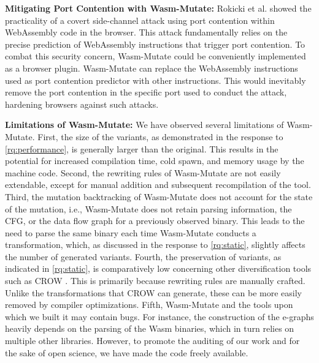 \documentclass[a4paper,fleqn]{cas-dc}
\newcommand*\badge[1]{ \colorbox{red}{\color{white}#1}}
\newcommand{\tool}{{\sc Wasm-Mutate}\xspace}
\newcommand{\Wasm}{WebAssembly\xspace}
\newcommand{\wasm}{\Wasm}
\newenvironment{revision1}{\color{blue}}{}
\newcommand{\todo}[1]{%
\refstepcounter{todo}
\noindent\textbf{\badge{TODO}} {\color{red}#1}
\addcontentsline{td}{todo}
{\color{red}\thesection.\thetodo\xspace #1}}
\begin{document}
\textbf{Mitigating Port Contention with \tool:} 
Rokicki et al. \cite{10.1145/3488932.3517411} showed the practicality of a covert side-channel attack using port contention within \Wasm code in the browser. This attack fundamentally relies on the precise prediction of WebAssembly instructions that trigger port contention.
To combat this security concern, \tool could be conveniently implemented as a browser plugin. 
\tool can replace the \wasm instructions used as port contention predictor with other instructions.
This would inevitably remove the port contention in the specific port used to conduct the attack, hardening browsers against such attacks.


\begin{revision1}
    
    \textbf{Limitations of \tool:} We have observed several limitations of \tool.
    First, the size of the variants, as demonstrated in the response to \ref{rq:performance}, is generally larger than the original. 
    This results in the potential for increased compilation time, cold spawn, and memory usage by the machine code. 
    Second, the rewriting rules of \tool are not easily extendable, except for manual addition and subsequent recompilation of the tool. 
    Third, the mutation backtracking of \tool does not account for the state of the mutation, i.e., \tool does not retain parsing information, the CFG, or the data flow graph for a previously observed binary. 
    This leads to the need to parse the same binary each time \tool conducts a transformation, which, as discussed in the response to \ref{rq:static}, slightly affects the number of generated variants. 
    Fourth, the preservation of variants, as indicated in \ref{rq:static}, is comparatively low concerning other diversification tools such as CROW \cite{arteaga2020crow}. 
    This is primarily because rewriting rules are manually crafted. 
    Unlike the transformations that CROW can generate, these can be more easily removed by compiler optimizations.
    Fifth, \tool and the tools upon which we built it may contain bugs. 
    For instance, the construction of the e-graphs heavily depends on the parsing of the Wasm binaries, which in turn relies on multiple other libraries. 
    However, to promote the auditing of our work and for the sake of open science, we have made the code freely available.
    

    
\end{revision1}
\end{document}
